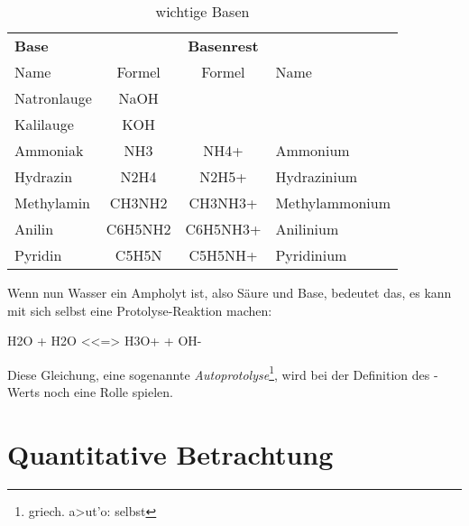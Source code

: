 \documentclass{arbeitsblatt}
\begin{document}
\begin{table}
  \centering
  \caption{wichtige Basen}\label{tab:basen}
  \begin{tabular}{lCCl}
    \toprule
      \bfseries Base &         & \textbf{Basenrest} & \\
      Name           & Formel  & Formel             & Name \\
    \midrule
      Natronlauge    & NaOH \\
      Kalilauge      & KOH  \\
      Ammoniak       & NH3     & NH4+               & Ammonium \\
      Hydrazin       & N2H4    & N2H5+              & Hydrazinium \\
      Methylamin     & CH3NH2  & CH3NH3+            & Methylammonium \\
      Anilin         & C6H5NH2 & C6H5NH3+           & Anilinium \\
      Pyridin        & C5H5N   & C5H5NH+            & Pyridinium \\
    \bottomrule
  \end{tabular}
\end{table}

Wenn nun Wasser ein Ampholyt ist, also Säure und Base, bedeutet das, es kann
mit sich selbst eine Protolyse-Reaktion machen:
\begin{reaction}
  H2O + H2O <<=> H3O+ + OH- \label{rct:autoprotolyse}
\end{reaction}
Diese Gleichung, eine sogenannte
\emph{Autoprotolyse}\footnote{griech. \textgreek{a>ut'o}: selbst}, wird bei
der Definition des \pH-Werts noch eine Rolle spielen.

\section{Quantitative Betrachtung}
\end{document}
